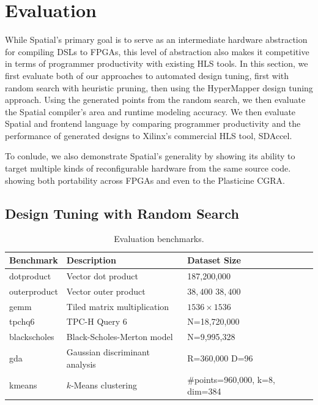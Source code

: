 \section{Evaluation}
\label{spatial-evaluation}

While Spatial's primary goal is to serve as an intermediate hardware abstraction
for compiling DSLs to FPGAs, this level of abstraction also makes it competitive
in terms of programmer productivity with existing HLS tools.
In this section, we first evaluate both of our approaches to automated design tuning,
first with random search with heuristic pruning,
then using the HyperMapper design tuning approach.
Using the generated points from the random search, we then
evaluate the Spatial compiler's area and runtime modeling accuracy.
We then evaluate Spatial and frontend language by comparing programmer productivity
and the performance of generated designs to Xilinx's commercial HLS tool, SDAccel.

To conlude, we also demonstrate Spatial's generality by showing its ability
to target multiple kinds of reconfigurable hardware from the same source code.
showing both portability across FPGAs and even to the Plasticine CGRA.

\subsection{Design Tuning with Random Search}

\begin{table}
\centering\footnotesize
\begin{tabular}{lm{3.6cm}m{2cm}}
\toprule
{\bf Benchmark} & {\bf Description} & {\bf Dataset Size} \\ \midrule
dotproduct   & Vector dot product             & 187,200,000\\ \midrule
outerproduct & Vector outer product           & $38,400$ $38,400$ \\ \midrule
gemm         & Tiled matrix multiplication    & $1536 \times 1536$\\ \midrule
tpchq6       & TPC-H Query 6                  & N=18,720,000 \\ \midrule
blackscholes & Black-Scholes-Merton model     & N=9,995,328 \\ \midrule
gda          & Gaussian discriminant analysis & R=360,000 D=96 \\ \midrule
kmeans       & $k$-Means clustering           & \#points=960,000, k=8, dim=384 \\ \midrule
\end{tabular}
\caption{Evaluation benchmarks.}
\label{t:benchmarks}
\end{table}

